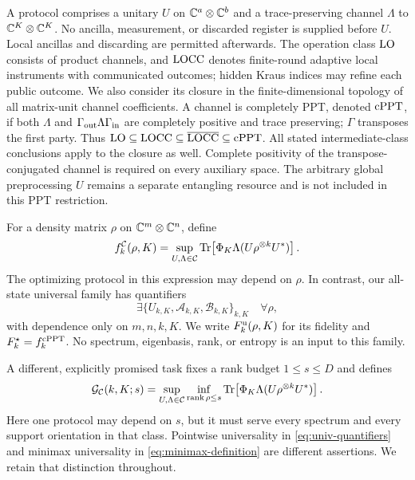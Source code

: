 A protocol comprises a unitary $U$ on $\mathbb C^a\otimes\mathbb C^b$ and a trace-preserving channel $\Lambda$ to $\mathbb C^K\otimes\mathbb C^K$. No ancilla, measurement, or discarded register is supplied before $U$. Local ancillas and discarding are permitted afterwards. The operation class $\mathrm{LO}$ consists of product channels, and $\mathrm{LOCC}$ denotes finite-round adaptive local instruments with communicated outcomes; hidden Kraus indices may refine each public outcome. We also consider its closure in the finite-dimensional topology of all matrix-unit channel coefficients. A channel is completely PPT, denoted $\mathrm{cPPT}$, if both $\Lambda$ and $\Gamma_{\rm out}\Lambda\Gamma_{\rm in}$ are completely positive and trace preserving; $\Gamma$ transposes the first party. Thus $\mathrm{LO}\subseteq\mathrm{LOCC}\subseteq\overline{\mathrm{LOCC}}\subseteq\mathrm{cPPT}$. All stated intermediate-class conclusions apply to the closure as well. Complete positivity of the transpose-conjugated channel is required on every auxiliary space. The arbitrary global preprocessing $U$ remains a separate entangling resource and is not included in this PPT restriction.

For a density matrix $\rho$ on $\mathbb C^m\otimes\mathbb C^n$, define
\begin{equation}\label{eq:state-aware}
 f_k^{\mathcal C}(\rho,K)=\sup_{U,\Lambda\in\mathcal C}
 \operatorname{Tr}\!\left[\Phi_K\Lambda(U\rho^{\otimes k}U^*)\right].
\end{equation}
The optimizing protocol in this expression may depend on $\rho$. In contrast, our all-state universal family has quantifiers
\begin{equation}\label{eq:univ-quantifiers}
 \exists\{U_{k,K},\mathcal A_{k,K},\mathcal B_{k,K}\}_{k,K}
 \quad\forall\rho,
\end{equation}
with dependence only on $m,n,k,K$. We write $F_k^{\rm u}(\rho,K)$ for its fidelity and $F_k^\star=f_k^{\mathrm{cPPT}}$. No spectrum, eigenbasis, rank, or entropy is an input to this family.

A different, explicitly promised task fixes a rank budget $1\le s\le D$ and defines
\begin{equation}\label{eq:minimax-definition}
 \mathcal G_{\mathcal C}(k,K;s)=\sup_{U,\Lambda\in\mathcal C}
 \inf_{\operatorname{rank}\rho\le s}\operatorname{Tr}\!\left[\Phi_K\Lambda(U\rho^{\otimes k}U^*)\right].
\end{equation}
Here one protocol may depend on $s$, but it must serve every spectrum and every support orientation in that class. Pointwise universality in \eqref{eq:univ-quantifiers} and minimax universality in \eqref{eq:minimax-definition} are different assertions. We retain that distinction throughout.

